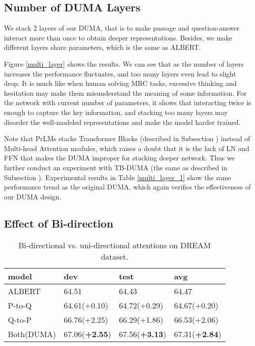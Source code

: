 \documentclass[letterpaper]{article} \usepackage{aaai21}  \usepackage{times}  \usepackage{helvet} \usepackage{courier}  \usepackage[hyphens]{url}  \usepackage{graphicx} \urlstyle{rm} \def\UrlFont{\rm}  \usepackage{natbib}  \usepackage{caption} \frenchspacing  \setlength{\pdfpagewidth}{8.5in}  \setlength{\pdfpageheight}{11in}
\begin{document}
\subsection{Number of DUMA Layers}




We stack 2 layers of our DUMA, that is to make passage and question-answer interact more than once to obtain deeper representations. Besides, we make different layers share parameters, which is the same as ALBERT. 

Figure \ref{multi_layer} shows the results. We can see that as the number of layers increases the performance fluctuates, and too many layers even lead to slight drop. It is much like when human solving MRC tasks, excessive thinking and hesitation may make them misunderstand the meaning of some information. For the network with current number of parameters, it shows that interacting twice is enough to capture the key information, and stacking too many layers may disorder the well-modeled representations and make the model harder trained. 

Note that PrLMs \cite{bert,roberta,albert} stacks Transformer Blocks (described in Subsection \textit{}) instead of Multi-head Attention modules, which raises a doubt that it is the lack of LN and FFN that makes the DUMA improper for stacking deeper network. Thus we further conduct an experiment with TB-DUMA (the same as described in Subsection \textit{}). Experimental results in Table \ref{multi_layer_1} show the same performance trend as the original DUMA, which again verifies the effectiveness of our DUMA design. 

\subsection{Effect of Bi-direction}
\begin{table}[t]\small
\renewcommand\arraystretch{1.1}
	\centering
	{
		\begin{tabular}{@{}p{1.7cm}|p{1.6cm}|p{1.6cm}|p{1.6cm}}
			\hline		
			 \;model & dev & test & avg \\
			\hline
			\hline
			\;ALBERT & 64.51 & 64.43 &64.47 \\
			\hline
			\;P-to-Q & 64.61\;(+0.10) & 64.72\;(+0.29) & 64.67\;(+0.20) \\
			\;Q-to-P & 66.76\;(+2.25) & 66.29\;(+1.86) & 66.53\;(+2.06)\\
			\;Both(DUMA) & 67.06\;(\textbf{+2.55}) & 67.56\;(\textbf{+3.13}) & 67.31\;(\textbf{+2.84})\\
			\hline
		\end{tabular}
		
	}
	\caption{\label{single_direction} Bi-directional vs. uni-directional attentions on DREAM dataset.}
\end{table}
\end{document}
